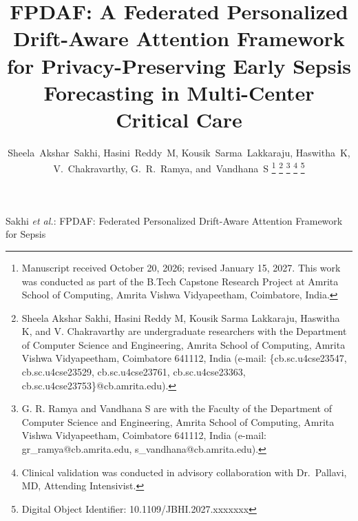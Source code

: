 \documentclass[journal,twocolumn,10pt]{IEEEtran}
\begin{document}
\title{FPDAF: A Federated Personalized Drift-Aware Attention Framework for Privacy-Preserving Early Sepsis Forecasting in Multi-Center Critical Care}

\author{Sheela~Akshar~Sakhi,
        Hasini~Reddy~M,
        Kousik~Sarma~Lakkaraju,
        Haswitha~K,
        V.~Chakravarthy,
        G.~R.~Ramya,
        and~Vandhana~S%
\thanks{Manuscript received October 20, 2026; revised January 15, 2027. This work was conducted as part of the B.Tech Capstone Research Project at Amrita School of Computing, Amrita Vishwa Vidyapeetham, Coimbatore, India.}%
\thanks{Sheela Akshar Sakhi, Hasini Reddy M, Kousik Sarma Lakkaraju, Haswitha K, and V. Chakravarthy are undergraduate researchers with the Department of Computer Science and Engineering, Amrita School of Computing, Amrita Vishwa Vidyapeetham, Coimbatore 641112, India (e-mail: \{cb.sc.u4cse23547, cb.sc.u4cse23529, cb.sc.u4cse23761, cb.sc.u4cse23363, cb.sc.u4cse23753\}@cb.amrita.edu).}%
\thanks{G. R. Ramya and Vandhana S are with the Faculty of the Department of Computer Science and Engineering, Amrita School of Computing, Amrita Vishwa Vidyapeetham, Coimbatore 641112, India (e-mail: gr\_ramya@cb.amrita.edu, s\_vandhana@cb.amrita.edu).}%
\thanks{Clinical validation was conducted in advisory collaboration with Dr.~Pallavi, MD, Attending Intensivist.}%
\thanks{Digital Object Identifier: 10.1109/JBHI.2027.xxxxxxx}
}

%
{Sakhi \MakeLowercase{\textit{et al.}}: FPDAF: Federated Personalized Drift-Aware Attention Framework for Sepsis}

\maketitle
\end{document}
